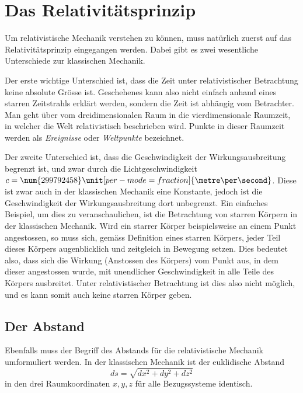 
\section{Das Relativitätsprinzip 
\label{relativ:section:relativistik}}

Um relativistische Mechanik verstehen zu können,
muss natürlich zuerst auf das Relativitätsprinzip eingegangen werden.
%
Dabei gibt es zwei wesentliche Unterschiede zur klassischen Mechanik.

Der erste wichtige Unterschied ist, dass die Zeit unter relativistischer Betrachtung keine absolute Grösse ist.
Geschehenes kann also nicht einfach anhand eines starren Zeitstrahls erklärt werden, sondern die Zeit ist abhängig vom Betrachter.
Man geht über vom dreidimensionalen Raum in die vierdimensionale Raumzeit, in welcher die Welt relativistisch beschrieben wird.
%
Punkte in dieser Raumzeit werden als \emph{Ereignisse} oder \emph{Weltpunkte} bezeichnet.
%
%

Der zweite Unterschied ist,
dass die Geschwindigkeit der Wirkungsausbreitung begrenzt ist,
%
und zwar durch die Lichtgeschwindigkeit
\(c=\num{299792458}\unit[per-mode = fraction]{\metre\per\second}\).
%
Diese ist zwar auch in der klassischen Mechanik eine Konstante,
jedoch ist die Geschwindigkeit der Wirkungsausbreitung dort unbegrenzt.
Ein einfaches Beispiel, um dies zu veranschaulichen,
ist die Betrachtung von starren Körpern in der klassischen Mechanik.
Wird ein starrer Körper beispielsweise an einem Punkt angestossen,
so muss sich, gemäss Definition eines starren Körpers,
%
jeder Teil dieses Körpers augenblicklich und zeitgleich in Bewegung setzen.
Dies bedeutet also, dass sich die Wirkung (Anstossen des Körpers)
vom Punkt aus, in dem dieser angestossen wurde,
mit unendlicher Geschwindigkeit in alle Teile des Körpers ausbreitet.
Unter relativistischer Betrachtung ist dies also nicht möglich,
und es kann somit auch keine starren Körper geben.


\subsection{Der Abstand 
\label{relativ:section:abstand}}

Ebenfalls muss der Begriff des Abstands für die relativistische Mechanik umformuliert werden.
In der klassischen Mechanik ist der euklidische Abstand
\begin{equation}
    ds=\sqrt{dx^2 + dy^2 + dz^2}
    \label{relativ:eqn:abstand-klass}
\end{equation}
in den drei Raumkoordinaten \(x, y, z\)
für alle Bezugssysteme identisch.

